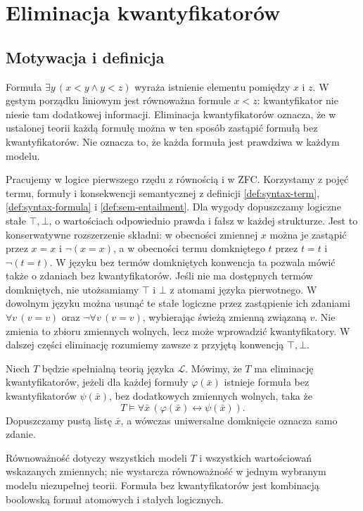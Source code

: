 \chapter{Eliminacja kwantyfikatorów}
\label{ch:mod-qe}
\section{Motywacja i definicja}
Formuła $\exists y\,(x<y\land y<z)$ wyraża istnienie
elementu pomiędzy $x$ i $z$. W gęstym porządku liniowym
jest równoważna formule $x<z$: kwantyfikator nie niesie
tam dodatkowej informacji. Eliminacja kwantyfikatorów
oznacza, że w ustalonej teorii każdą formułę można w ten
sposób zastąpić formułą bez kwantyfikatorów. Nie oznacza
to, że każda formuła jest prawdziwa w każdym modelu.

Pracujemy w logice pierwszego rzędu z równością i w ZFC.
Korzystamy z pojęć termu, formuły i konsekwencji semantycznej
z definicji \ref{def:syntax-term}, \ref{def:syntax-formula}
i \ref{def:sem-entailment}.
Dla wygody dopuszczamy logiczne stałe $\top,\bot$,
o wartościach odpowiednio prawda i fałsz w każdej strukturze.
Jest to konserwatywne rozszerzenie składni: w obecności
zmiennej $x$ można je zastąpić przez $x=x$ i $\neg(x=x)$,
a w obecności termu domkniętego $t$ przez $t=t$ i $\neg(t=t)$.
W języku bez termów domkniętych konwencja ta pozwala
mówić także o zdaniach bez kwantyfikatorów.
Jeśli nie ma dostępnych termów domkniętych, nie utożsamiamy
$\top$ i $\bot$ z atomami języka pierwotnego.
W dowolnym języku można usunąć te stałe logiczne
przez zastąpienie ich zdaniami $\forall v\,(v=v)$
oraz $\neg\forall v\,(v=v)$, wybierając świeżą zmienną
związaną $v$. Nie zmienia to zbioru zmiennych wolnych,
lecz może wprowadzić kwantyfikatory. W dalszej części
eliminację rozumiemy zawsze z przyjętą konwencją
$\top,\bot$.

\begin{definicja}
\label{def:mod-qe}
Niech $T$ będzie spełnialną teorią języka $\mathcal L$.
Mówimy, że $T$ ma eliminację kwantyfikatorów, jeżeli dla
każdej formuły $\varphi(\bar x)$ istnieje formuła
bez kwantyfikatorów $\psi(\bar x)$, bez dodatkowych
zmiennych wolnych, taka że
\[
T\models\forall\bar x\,(\varphi(\bar x)\leftrightarrow\psi(\bar x)).
\]
Dopuszczamy pustą listę $\bar x$, a wówczas uniwersalne
domknięcie oznacza samo zdanie.
\end{definicja}

Równoważność dotyczy wszystkich modeli $T$ i wszystkich
wartościowań wskazanych zmiennych; nie wystarcza równoważność
w jednym wybranym modelu niezupełnej teorii.
Formuła bez kwantyfikatorów jest kombinacją boolowską
formuł atomowych i stałych logicznych.

